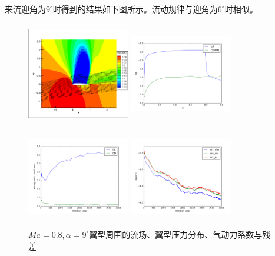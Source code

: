 \documentclass[UTF8]{ctexart}
\begin{document}
\indent 来流迎角为$9^\circ$时得到的结果如下图所示。流动规律与迎角为$6^\circ$时相似。
\begin{figure}[htbp]\centering
  \begin{minipage}{5cm}
    \centering
    \includegraphics[height=4.5cm,width=4.5cm]{../pic/0.8_9_flowfield.png}
  \end{minipage}%
  \begin{minipage}{5cm}
    \centering
    \includegraphics[height=4.5cm,width=4.5cm]{../pic/0.8_9_Cp.png}
  \end{minipage}

  \begin{minipage}{5cm}
    \centering
    \includegraphics[height=4.5cm,width=4.5cm]{../pic/0.8_9_cl_cd.png}
  \end{minipage}%
  \begin{minipage}{5cm}
    \centering
    \includegraphics[height=4.5cm,width=4.5cm]{../pic/0.8_9_residual.png}
  \end{minipage}
  \caption{$Ma=0.8,\alpha=9^\circ$翼型周围的流场、翼型压力分布、气动力系数与残差}
\end{figure}
\end{document}

